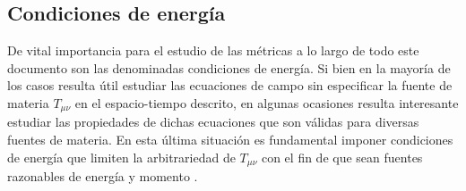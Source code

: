 \documentclass{article}
\numberwithin{equation}{section}
\theoremstyle{definition}
\begin{document}
%
%
%
%
%
%
%
%
%
%

	\subsection{Condiciones de energía}

De vital importancia para el estudio de las métricas a lo largo de todo este documento son las denominadas condiciones de energía. Si bien en la mayoría de los casos resulta útil estudiar las ecuaciones de campo sin especificar la fuente de materia $T_{\mu \nu}$ en el espacio-tiempo descrito, en algunas ocasiones resulta interesante estudiar las propiedades de dichas ecuaciones que son válidas para diversas fuentes de materia. En esta última situación es fundamental imponer condiciones de energía que limiten la arbitrariedad de $T_{\mu \nu}$ con el fin de que sean fuentes razonables de energía y momento \cite{carroll}.\\
\end{document}
